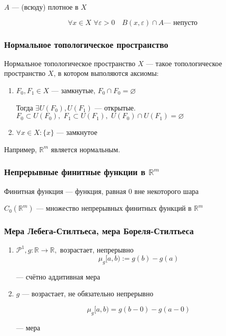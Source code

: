 \documentclass{article}
\def\dbl{\,\,}
\begin{document}
$A$ --- (всюду) плотное в $X$

\[\forall x \in X \dbl \forall \varepsilon > 0 \quad B(x, \varepsilon) \cap A\text{--- непусто}\]

\subsubsection{Нормальное топологическое пространство}

Нормальное топологическое пространство $X$ --- такое топологическое пространство $X$, в котором выполяются аксиомы:

\begin{enumerate}
    \item $F_0, F_1 \in X$ --- замкнутые, $F_0 \cap F_0 = \varnothing$
    
    Тогда $\exists U(F_0), U(F_1)$ --- открытые. $F_0 \subset U(F_0), \dbl F_1 \subset U(F_1), \dbl U(F_0) \cap U(F_1) = \varnothing$

    \item $\forall x \in X: \{x\}$ --- замкнутое
\end{enumerate}

Например, $\mathbb{R}^m$ является нормальным.

\subsubsection{Непрерывные финитные функции в $\mathbb{R}^m$}

Финитная функция --- функция, равная 0 вне некоторого шара

$C_0(\mathbb{R}^m)$ --- множество непрерывных финитных функций в $\mathbb{R}^m$

\subsubsection{Мера Лебега-Стилтьеса, мера Бореля-Стилтьеса}

\begin{enumerate}
    \item $\mathcal{P}^{1}, g: \mathbb{R} \rightarrow \mathbb{R}, $ возрастает, непрерывно
    \[\mu_g[a, b) := g(b) - g(a)\]

    --- счётно аддитивная мера
    \item $g$ --- возрастает, не обязательно непрерывно
    
    \[\mu_g[a, b) = g(b - 0) - g(a - 0)\]

    --- мера
\end{enumerate}
\end{document}

